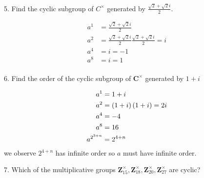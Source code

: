 \begin{mdframed}[style=darkQuesion]
5. Find the cyclic subgroup of $C^{\times}$ generated by $\frac{\sqrt{2}+\sqrt{2}i}{2}$.
\end{mdframed}
\begin{mdframed}[style=darkAnswer,frametitle={Joe Starr}]
 \begin{align*}
   a^{1}&=\frac{\sqrt{2}+\sqrt{2}i}{2}\\
   a^{2}&=\frac{\sqrt{2}+\sqrt{2}i}{2}\frac{\sqrt{2}+\sqrt{2}i}{2}=i\\
   a^{4}&=i=-1\\
   a^{8}&=i=1\\
 \end{align*}
\end{mdframed}
\newpage
\begin{mdframed}[style=darkQuesion]
6. Find the order of the cyclic subgroup of $\mathbf{C}^{\times}$ generated by $1+i$
\end{mdframed}
\begin{mdframed}[style=darkAnswer,frametitle={Joe Starr}]
 \begin{align*}
  a^{1}&=1+i\\
  a^{2}&=\left(1+i\right)\left(1+i\right)=2i\\
  a^{4}&=-4\\
  a^{8}&=16\\
  a^{2^{3+n}}&={2^{4+n}}\\
 \end{align*}
 we observe $2^{4+n}$ has infinite order so $a$ must have infinite order. 
\end{mdframed}
\newpage
\begin{mdframed}[style=darkQuesion]
7. Which of the multiplicative groups $\mathbf{Z}_{15}^{\times}, \mathbf{Z}_{18}^{\times}, \mathbf{Z}_{20}^{\times}, \mathbf{Z}_{27}^{\times}$ are cyclic?
\end{mdframed}
